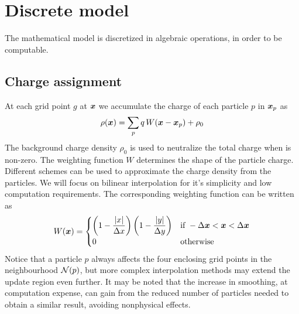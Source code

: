 \chapter{Discrete model}
\label{ch:discrete-model}

The mathematical model is discretized in algebraic operations, in order to be 
computable.

\section{Charge assignment}
At each grid point $g$ at $\bm{x}$ we accumulate the charge of each particle $p$ in 
$\bm{x}_p$ as
%
\begin{equation}%
\rho(\x) = \sum_p q\,W(\x - \x_p) + \rho_0
\end{equation}%
%
The background charge density $\rho_0$ is used to neutralize the total charge 
when is non-zero. The weighting function $W$ determines the shape of the 
particle charge. Different schemes can be used to approximate the charge density 
from the particles. We will focus on bilinear interpolation for it's simplicity 
and low computation requirements. The corresponding weighting function can be 
written as
%
\begin{equation}%
W(\x) =
\begin{cases}
			\displaystyle\left(1 - \frac{|x|}{\Delta x}\right)
				\left(1 - \frac{|y|}{\Delta y}\right) & \text{if}\ -\Delta\x < \x < 
				\Delta \x\\
			0 & \text{otherwise}
\end{cases}
\end{equation}%
%
Notice that a particle $p$ always affects the four enclosing grid points in the 
neighbourhood $\mathcal{N}(p)$, but more complex interpolation methods may extend the 
update region even further. It may be noted that the increase in smoothing, at 
computation expense, can gain from the reduced number of particles needed to 
obtain a similar result, avoiding nonphysical effects.
%
